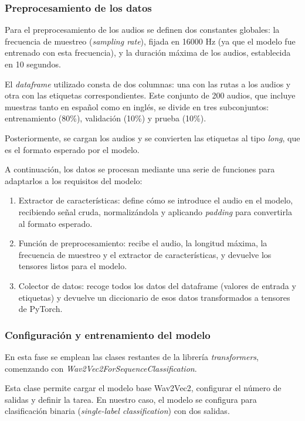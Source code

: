 \subsubsection*{Preprocesamiento de los datos}

Para el preprocesamiento de los audios se definen dos constantes globales: la frecuencia de muestreo (\textit{sampling rate}), fijada en 16000 Hz (ya que el modelo fue entrenado con esta frecuencia), y la duración máxima de los audios, establecida en 10 segundos.

El \textit{dataframe} utilizado consta de dos columnas: una con las rutas a los audios y otra con las etiquetas correspondientes. Este conjunto de 200 audios, que incluye muestras tanto en español como en inglés, se divide en tres subconjuntos: entrenamiento (80\%), validación (10\%) y prueba (10\%).

Posteriormente, se cargan los audios y se convierten las etiquetas al tipo \textit{long}, que es el formato esperado por el modelo.

A continuación, los datos se procesan mediante una serie de funciones para adaptarlos a los requisitos del modelo:

\begin{enumerate}
 \item Extractor de características: define cómo se introduce el audio en el modelo, recibiendo señal cruda, normalizándola y aplicando \textit{padding} para convertirla al formato esperado.
 
 \item Función de preprocesamiento: recibe el audio, la longitud máxima, la frecuencia de muestreo y el extractor de características, y devuelve los tensores listos para el modelo.
 
 \item Colector de datos: recoge todos los datos del dataframe (valores de entrada y etiquetas) y devuelve un diccionario de esos datos transformados a tensores de PyTorch.
\end{enumerate}

\subsubsection*{Configuración y entrenamiento del modelo}

En esta fase se emplean las clases restantes de la librería \textit{transformers}, comenzando con \textit{Wav2Vec2ForSequenceClassification}.

Esta clase permite cargar el modelo base Wav2Vec2, configurar el número de salidas y definir la tarea. En nuestro caso, el modelo se configura para clasificación binaria (\textit{single-label classification}) con dos salidas.

